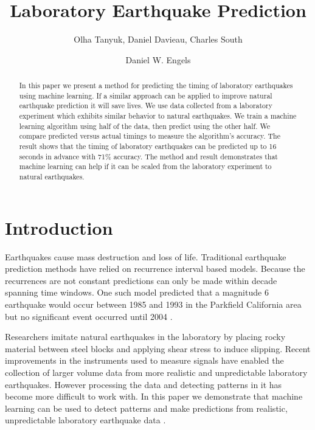 \documentclass[]{llncs} %
\begin{document}

\title{Laboratory Earthquake Prediction}

\author{Olha Tanyuk, Daniel Davieau, Charles South \and Daniel W. Engels}



\maketitle

\begin{abstract}
In this paper we present a method for predicting the timing of laboratory earthquakes using machine learning. If a similar approach can be applied to improve natural earthquake prediction it will save lives. We use data collected from a laboratory experiment which exhibits similar behavior to natural earthquakes. We train a machine learning algorithm using half of the data, then predict using the other half. We compare predicted versus actual timings to measure the algorithm's accuracy. The result shows that the timing of laboratory earthquakes can be predicted up to 16 seconds in advance with 71\% accuracy. The method and result demonstrates that machine learning can help if it can be scaled from the laboratory experiment to natural earthquakes. \par
\end{abstract}

\section{Introduction}

Earthquakes cause mass destruction and loss of life. Traditional earthquake prediction methods have relied on recurrence interval based models. Because the recurrences are not constant predictions can only be made within decade spanning time windows. One such model predicted that a magnitude 6 earthquake would occur between 1985 and 1993 in the Parkfield California area but no significant event occurred until 2004 \cite{Jackson}. \par

Researchers imitate natural earthquakes in the laboratory by placing rocky material between steel blocks and applying shear stress to induce slipping. Recent improvements in the instruments \cite{Bertrand} used to measure signals have enabled the collection of larger volume data from more realistic and unpredictable laboratory earthquakes. However processing the data and detecting patterns in it has become more difficult to work with. In this paper we demonstrate that machine learning can be used to detect patterns and make predictions from realistic, unpredictable laboratory earthquake data \cite{kaggle}.\par
\end{document}
